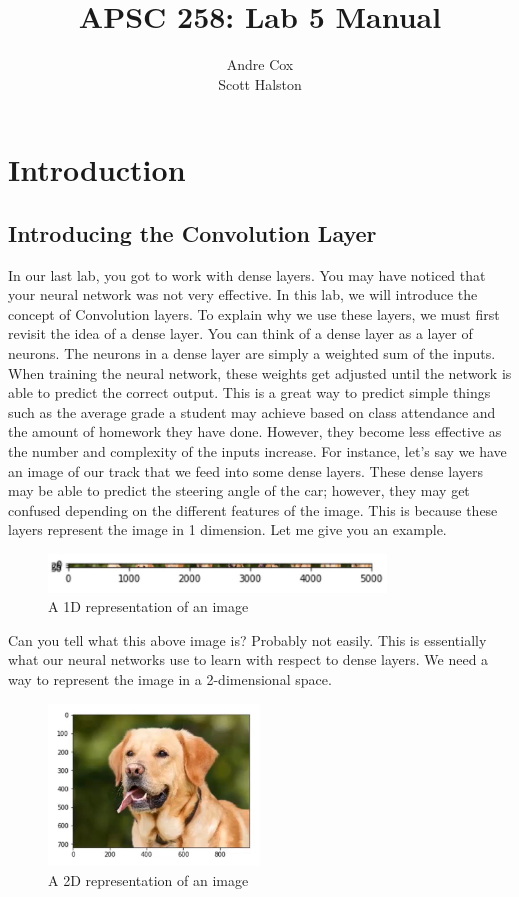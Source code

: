 \documentclass[11pt]{report}
\title{APSC 258: Lab 5 Manual}
\author{Andre Cox \\ Scott Halston}
\begin{document}
\maketitle
\tableofcontents

\clearpage

\chapter{Introduction}
\section{Introducing the Convolution Layer}
In our last lab, you got to work with dense layers. You may have noticed that your neural network was not very effective. In this lab, we will introduce the concept of Convolution layers. To explain why we use these layers, we must first revisit the idea of a dense layer. You can think of a dense layer as a layer of neurons. The neurons in a dense layer are simply a weighted sum of the inputs. When training the neural network, these weights get adjusted until the network is able to predict the correct output. This is a great way to predict simple things such as the average grade a student may achieve based on class attendance and the amount of homework they have done. However, they become less effective as the number and complexity of the inputs increase. For instance, let's say we have an image of our track that we feed into some dense layers. These dense layers may be able to predict the steering angle of the car; however, they may get confused depending on the different features of the image. This is because these layers represent the image in 1 dimension. Let me give you an example.

\begin{figure}[h]
\centering
\includegraphics[width=0.8\textwidth]{dogdense.png}
\caption{A 1D representation of an image}
\label{fig:1d}
\end{figure}

Can you tell what this above image is? Probably not easily. This is essentially what our neural networks use to learn with respect to dense layers. We need a way to represent the image in a 2-dimensional space.

\begin{figure}[h]
\centering
\includegraphics[width=0.5\textwidth]{dogconv.png}
\caption{A 2D representation of an image}
\label{fig:2d}
\end{figure}
\end{document}
